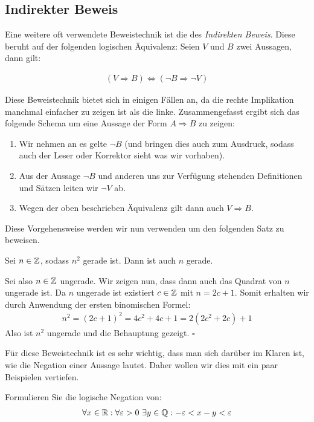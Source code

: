 \begin{proof*}
\end{proof*}

\subsection{Indirekter Beweis}
Eine weitere oft verwendete Beweistechnik ist die des \textit{Indirekten Beweis}. Diese beruht auf der folgenden logischen Äquivalenz: 
Seien $V$ und $B$ zwei Aussagen, dann gilt: 

\begin{align}
    (V \Rightarrow B) \iff (\neg B \Rightarrow \neg V)
\end{align}

Diese Beweistechnik bietet sich in einigen Fällen an, da die rechte Implikation manchmal einfacher zu zeigen ist als die linke. 
Zusammengefasst ergibt sich das folgende Schema um eine Aussage der Form $A \Rightarrow B$ zu zeigen: 
\begin{enumerate}
    \item 
    Wir nehmen an es gelte $\neg B$ (und bringen dies auch zum Ausdruck, sodass auch der Leser oder Korrektor sieht was wir vorhaben).
    \item 
    Aus der Aussage $\neg B$ und anderen uns zur Verfügung stehenden Definitionen und Sätzen leiten wir $\neg V$ ab. 
    \item 
    Wegen der oben beschrieben Äquivalenz gilt dann auch $V \Rightarrow B$. 
\end{enumerate}
Diese Vorgehensweise werden wir nun verwenden um den folgenden Satz zu beweisen. 
\begin{theorem}
    Sei $n \in \mathbb{Z}$, sodass $n^2$ gerade ist. Dann ist auch $n$ gerade. 
\end{theorem}
\begin{proof*}
    Sei also $n \in \mathbb{Z}$ ungerade. Wir zeigen nun, dass dann auch das Quadrat von $n$ ungerade ist. Da $n$ ungerade ist existiert $c \in \mathbb{Z}$ mit $n = 2c + 1$. 
    Somit erhalten wir durch Anwendung der ersten binomischen Formel: 
    \begin{align*}
        n^2 = (2c +1)^2 = 4c^2 + 4c + 1 = 2(2c^2+2c) + 1 
    \end{align*}
    Also ist $n^2$ ungerade und die Behauptung gezeigt. 
    \hfill $\square$
\end{proof*}

Für diese Beweistechnik ist es sehr wichtig, dass man sich darüber im Klaren ist, wie die Negation einer Aussage lautet. Daher wollen wir dies mit ein paar Beispielen vertiefen. 
\begin{example} %
    Formulieren Sie die logische Negation von: 
    \begin{align*}
        \forall x \in \mathbb{R}: \forall \varepsilon > 0 \ \exists y \in \mathbb{Q} : -\varepsilon < x - y < \varepsilon
    \end{align*}
\end{example}

